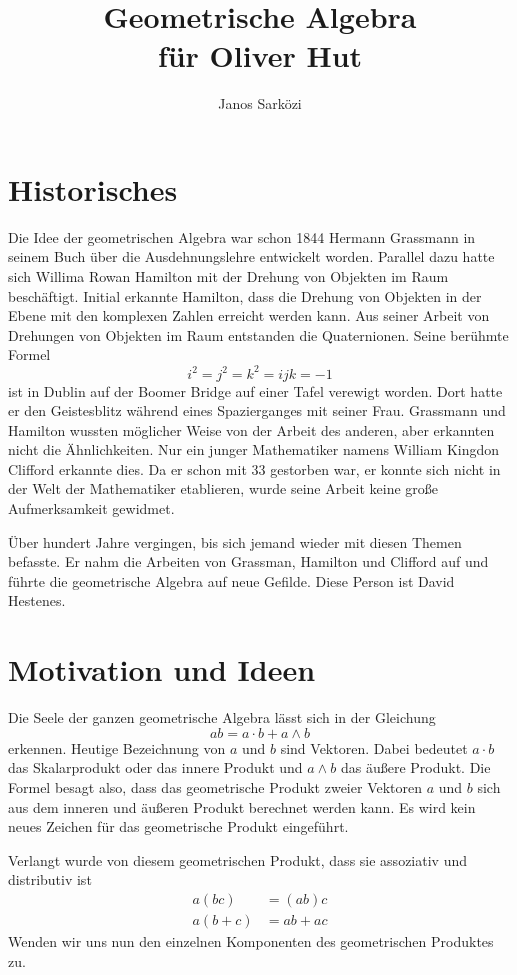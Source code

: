 \documentclass[fleqn]{scrartcl}
\title{Geometrische Algebra \\
für Oliver Hut}
\author{Janos Sarközi}
\numberwithin{equation}{section}
\begin{document}
\maketitle
\newpage
\section{Historisches}
Die Idee der geometrischen Algebra war schon 1844 Hermann Grassmann in seinem
Buch über die Ausdehnungslehre entwickelt worden. Parallel dazu hatte sich
Willima Rowan Hamilton mit der Drehung von Objekten im Raum beschäftigt.
Initial erkannte Hamilton, dass die Drehung von Objekten in der Ebene mit den
komplexen Zahlen erreicht werden kann. Aus seiner Arbeit von Drehungen von
Objekten im Raum entstanden die Quaternionen. Seine berühmte Formel
\[i^2=j^2=k^2=ijk=-1\]
ist in Dublin auf der Boomer Bridge auf einer Tafel verewigt worden. Dort
hatte er den Geistesblitz während eines Spazierganges mit seiner Frau.
Grassmann und Hamilton wussten möglicher Weise von der Arbeit des anderen,
aber erkannten nicht die Ähnlichkeiten. Nur ein junger Mathematiker namens
William Kingdon Clifford erkannte dies. Da er schon mit 33 gestorben war,
er konnte sich nicht in der Welt der Mathematiker etablieren, wurde seine
Arbeit keine große Aufmerksamkeit gewidmet.

Über hundert Jahre vergingen, bis sich jemand wieder mit diesen Themen
befasste. Er nahm die Arbeiten von Grassman, Hamilton und Clifford auf und
führte die geometrische Algebra auf neue Gefilde. Diese Person ist David
Hestenes.

\section{Motivation und Ideen}
Die Seele der ganzen geometrische Algebra lässt sich in der
Gleichung
\[ab = a\cdot b + a\wedge b\]
erkennen. Heutige Bezeichnung von $a$ und $b$ sind Vektoren. Dabei bedeutet
$a\cdot b$ das Skalarprodukt oder das innere Produkt und $a\wedge b$ das
äußere Produkt. Die Formel besagt also, dass das geometrische Produkt zweier
Vektoren $a$ und $b$ sich aus dem inneren und äußeren Produkt berechnet
werden kann. Es wird kein neues Zeichen für das geometrische Produkt
eingeführt.

Verlangt wurde von diesem geometrischen Produkt, dass sie assoziativ und 
distributiv ist
\begin{align*}
    a(bc) &= (ab)c \\
    a(b+c) &= ab + ac
\end{align*}
Wenden wir uns nun den einzelnen Komponenten des geometrischen Produktes zu.
\end{document}
